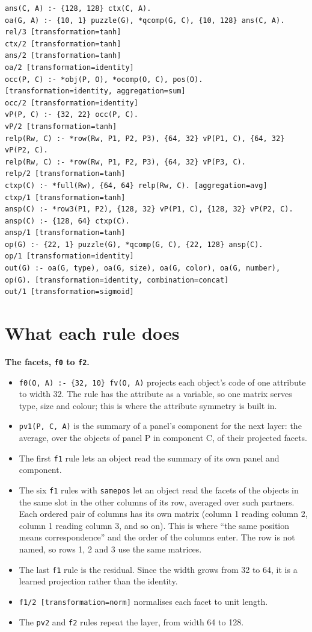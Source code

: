 \begin{Verbatim}[fontsize=\small,breaklines]
ans(C, A) :- {128, 128} ctx(C, A).
oa(G, A) :- {10, 1} puzzle(G), *qcomp(G, C), {10, 128} ans(C, A).
rel/3 [transformation=tanh]
ctx/2 [transformation=tanh]
ans/2 [transformation=tanh]
oa/2 [transformation=identity]
occ(P, C) :- *obj(P, O), *ocomp(O, C), pos(O). [transformation=identity, aggregation=sum]
occ/2 [transformation=identity]
vP(P, C) :- {32, 22} occ(P, C).
vP/2 [transformation=tanh]
relp(Rw, C) :- *row(Rw, P1, P2, P3), {64, 32} vP(P1, C), {64, 32} vP(P2, C).
relp(Rw, C) :- *row(Rw, P1, P2, P3), {64, 32} vP(P3, C).
relp/2 [transformation=tanh]
ctxp(C) :- *full(Rw), {64, 64} relp(Rw, C). [aggregation=avg]
ctxp/1 [transformation=tanh]
ansp(C) :- *row3(P1, P2), {128, 32} vP(P1, C), {128, 32} vP(P2, C).
ansp(C) :- {128, 64} ctxp(C).
ansp/1 [transformation=tanh]
op(G) :- {22, 1} puzzle(G), *qcomp(G, C), {22, 128} ansp(C).
op/1 [transformation=identity]
out(G) :- oa(G, type), oa(G, size), oa(G, color), oa(G, number), op(G). [transformation=identity, combination=concat]
out/1 [transformation=sigmoid]
\end{Verbatim}

\section{What each rule does}\label{sec:C.3}

\textbf{The facets, \texttt{f0} to \texttt{f2}.}

\begin{itemize}
\item \texttt{f0(O, A) :- \{32, 10\} fv(O, A)} projects each object's code of one attribute to width 32. The rule has the attribute as a variable, so one matrix serves type, size and colour; this is where the attribute symmetry is built in.
\item \texttt{pv1(P, C, A)} is the summary of a panel's component for the next layer: the average, over the objects of panel P in component C, of their projected facets.
\item The first \texttt{f1} rule lets an object read the summary of its own panel and component.
\item The six \texttt{f1} rules with \texttt{samepos} let an object read the facets of the objects in the same slot in the other columns of its row, averaged over such partners. Each ordered pair of columns has its own matrix (column 1 reading column 2, column 1 reading column 3, and so on). This is where ``the same position means correspondence'' and the order of the columns enter. The row is not named, so rows 1, 2 and 3 use the same matrices.
\item The last \texttt{f1} rule is the residual. Since the width grows from 32 to 64, it is a learned projection rather than the identity.
\item \texttt{f1/2 [transformation=norm]} normalises each facet to unit length.
\item The \texttt{pv2} and \texttt{f2} rules repeat the layer, from width 64 to 128.
\end{itemize}

